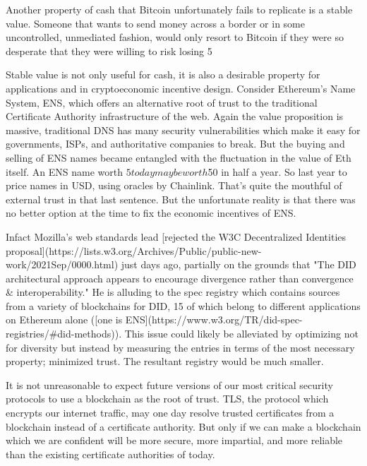 Another property of cash that Bitcoin unfortunately fails to replicate is a stable value. Someone that wants to send money across a border or in some uncontrolled, unmediated fashion, would only resort to Bitcoin if they were so desperate that they were willing to risk losing 5%

Stable value is not only useful for cash, it is also a desirable property for applications and in cryptoeconomic incentive design. Consider Ethereum's Name System, ENS, which offers an alternative root of trust to the traditional Certificate Authority infrastructure of the web. Again the value proposition is massive, traditional DNS has many security vulnerabilities which make it easy for governments, ISPs, and authoritative companies to break. But the buying and selling of ENS names became entangled with the fluctuation in the value of Eth itself. An ENS name worth $5 today may be worth $50 in half a year. So last year  to price names in USD, using oracles by Chainlink. That's quite the mouthful of external trust in that last sentence. But the unfortunate reality is that there was no better option at the time to fix the economic incentives of ENS. 

Infact Mozilla's web standards lead [rejected the W3C Decentralized Identities proposal](https://lists.w3.org/Archives/Public/public-new-work/2021Sep/0000.html) just days ago, partially on the grounds that "The DID architectural approach appears to encourage divergence rather than convergence & interoperability." He is alluding to the spec registry which contains sources from a variety of blockchains for DID, 15 of which belong to different applications on Ethereum alone ([one is ENS](https://www.w3.org/TR/did-spec-registries/#did-methods)). This issue could likely be alleviated by optimizing not for diversity but instead by measuring the entries in terms of the most necessary property; minimized trust. The resultant registry would be much smaller.

It is not unreasonable to expect future versions of our most critical security protocols to use a blockchain as the root of trust. TLS, the protocol which encrypts our internet traffic, may one day resolve trusted certificates from a blockchain instead of a certificate authority. But only if we can make a blockchain which we are confident will be more secure, more impartial, and more reliable than the existing certificate authorities of today.

